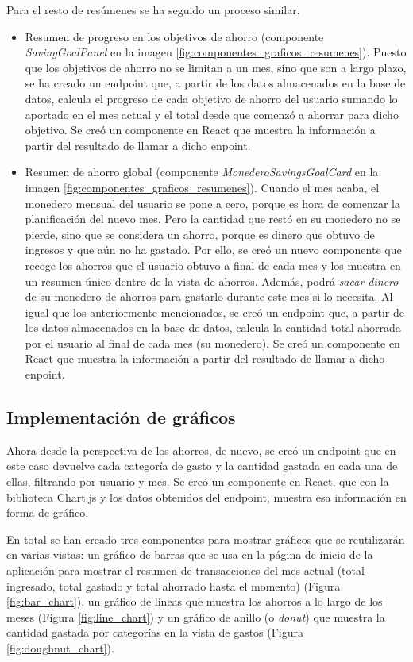 Para el resto de resúmenes se ha seguido un proceso similar. 

\begin{itemize}
    \item Resumen de progreso en los objetivos de ahorro (componente \textit{SavingGoalPanel} en la imagen \ref{fig:componentes_graficos_resumenes}). Puesto que los objetivos de ahorro no se limitan a un mes, sino que son a largo plazo, se ha creado un endpoint que, a partir de los datos almacenados en la base de datos, calcula el progreso de cada objetivo de ahorro del usuario sumando lo aportado en el mes actual y el total desde que comenzó a ahorrar para dicho objetivo. Se creó un componente en React que muestra la información a partir del resultado de llamar a dicho enpoint.
    \item Resumen de ahorro global (componente \textit{MonederoSavingsGoalCard} en la imagen \ref{fig:componentes_graficos_resumenes}). Cuando el mes acaba, el monedero mensual del usuario se pone a cero, porque es hora de comenzar la planificación del nuevo mes. Pero la cantidad que restó en su monedero no se pierde, sino que se considera un ahorro, porque es dinero que obtuvo de ingresos y que aún no ha gastado. Por ello, se creó un nuevo componente que recoge los ahorros que el usuario obtuvo a final de cada mes y los muestra en un resumen único dentro de la vista de ahorros. Además, podrá \textit{sacar dinero} de su monedero de ahorros para gastarlo durante este mes si lo necesita. Al igual que los anteriormente mencionados, se creó un endpoint que, a partir de los datos almacenados en la base de datos, calcula la cantidad total ahorrada por el usuario al final de cada mes (su monedero). Se creó un componente en React que muestra la información a partir del resultado de llamar a dicho enpoint.

\end{itemize}


\subsection{Implementación de gráficos}
Ahora desde la perspectiva de los ahorros, de nuevo, se creó un endpoint que en este caso devuelve cada categoría de gasto y la cantidad gastada en cada una de ellas, filtrando por usuario y mes. Se creó un componente en React, que con la biblioteca Chart.js y los datos obtenidos del endpoint, muestra esa información en forma de gráfico.

En total se han creado tres componentes para mostrar gráficos que se reutilizarán en varias vistas: un gráfico de barras que se usa en la página de inicio de la aplicación para mostrar el resumen de transacciones del mes actual (total ingresado, total gastado y total ahorrado hasta el momento) (Figura \ref{fig:bar_chart}), un gráfico de líneas que muestra los ahorros a lo largo de los meses (Figura \ref{fig:line_chart}) y un gráfico de anillo (o \textit{donut}) que muestra la cantidad gastada por categorías en la vista de gastos (Figura \ref{fig:doughnut_chart}). 

